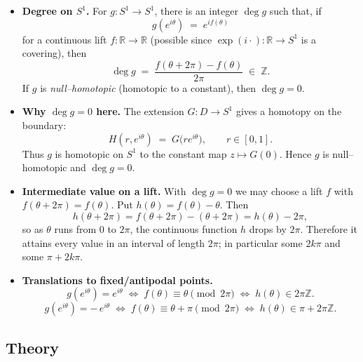 \documentclass[12pt,a4paper]{article}
\theoremstyle{plain}
\theoremstyle{definition}
\theoremstyle{remark}
\theoremstyle{remark}
\begin{document}
\begin{itemize}\setlength{\itemsep}{0.7em}
	
	\item \textbf{Degree on $S^{1}$.}
	For $g:S^{1}\to S^{1}$, there is an integer $\deg g$ such that, if
	\[
	g(e^{i\theta}) \;=\; e^{i f(\theta)}
	\]
	for a continuous lift $f:\mathbb{R}\to\mathbb{R}$ (possible since $\exp(i\cdot):\mathbb{R}\to S^{1}$ is a covering), then
	\[
	\deg g \;=\; \frac{f(\theta+2\pi)-f(\theta)}{2\pi} \;\in\; \mathbb{Z}.
	\]
	If $g$ is \emph{null–homotopic} (homotopic to a constant), then $\deg g=0$.
	
	\item \textbf{Why $\deg g=0$ here.}
	The extension $G:D\to S^{1}$ gives a homotopy on the boundary:
	\[
	H(r,e^{i\theta}) \;=\; G\!\big(re^{i\theta}\big), \qquad r\in[0,1].
	\]
	Thus $g$ is homotopic on $S^{1}$ to the constant map $z\mapsto G(0)$.
	Hence $g$ is null–homotopic and $\deg g=0$.
	
	\item \textbf{Intermediate value on a lift.}
	With $\deg g=0$ we may choose a lift $f$ with $f(\theta+2\pi)=f(\theta)$.
	Put $h(\theta)=f(\theta)-\theta$. Then
	\[
	h(\theta+2\pi)=f(\theta+2\pi)-(\theta+2\pi)=h(\theta)-2\pi,
	\]
	so as $\theta$ runs from $0$ to $2\pi$, the continuous function $h$ drops by $2\pi$.
	Therefore it attains every value in an interval of length $2\pi$; in particular some $2k\pi$
	and some $\pi+2k\pi$.
	
	\item \textbf{Translations to fixed/antipodal points.}
	\[
	g(e^{i\theta})=e^{i\theta}
	\;\Longleftrightarrow\;
	f(\theta)\equiv \theta \pmod{2\pi}
	\;\Longleftrightarrow\;
	h(\theta)\in 2\pi\mathbb{Z}.
	\]
	\[
	g(e^{i\theta})=-\,e^{i\theta}
	\;\Longleftrightarrow\;
	f(\theta)\equiv \theta+\pi \pmod{2\pi}
	\;\Longleftrightarrow\;
	h(\theta)\in \pi+2\pi\mathbb{Z}.
	\]
	
\end{itemize}


\subsection*{Theory}
\end{document}
